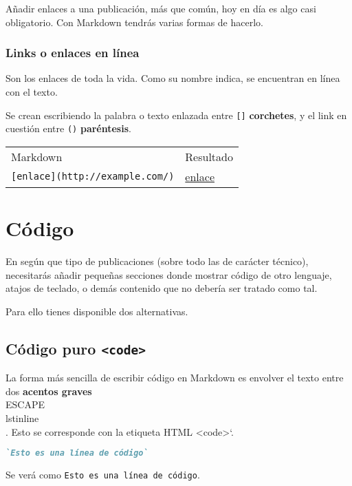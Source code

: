 Añadir enlaces a una publicación, más que común, hoy en día es algo casi obligatorio. Con Markdown tendrás varias formas de hacerlo.

\subsection{Links o enlaces en línea}

Son los enlaces de toda la vida. Como su nombre indica, se encuentran en línea con el texto.

Se crean escribiendo la palabra o texto enlazada entre \lstinline{[]} \textbf{corchetes}, y el link en cuestión entre \lstinline{()} \textbf{paréntesis}.

\begin{table}[]
\begin{tabular}{ll}
 Markdown & Resultado \\              
 \lstinline{[enlace](http://example.com/)} & \href{http://example.com/}{enlace} \\
\end{tabular}
\end{table}

\chapter{Código}

En según que tipo de publicaciones (sobre todo las de carácter técnico), necesitarás añadir pequeñas secciones donde mostrar código de otro lenguaje, atajos de teclado, o demás contenido que no debería ser tratado como tal.

Para ello tienes disponible dos alternativas.

\section{Código puro \lstinline{<code>}}

La forma más sencilla de escribir código en Markdown es envolver el texto entre dos \textbf{acentos graves} \\ESCAPE\\lstinline{\\. Esto se corresponde con la etiqueta HTML }<code>`.

\begin{lstlisting}[language= md]
`Esto es una línea de código`
\end{lstlisting}

Se verá como \lstinline{Esto es una línea de código}.

